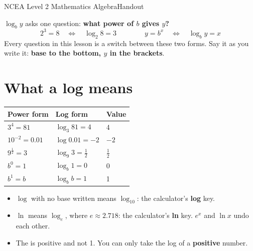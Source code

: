 \documentclass[11pt]{article}
\begin{document}
  {NCEA Level 2 Mathematics \textperiodcentered{} Algebra}{Handout}

\begin{keybox}[title={The one idea: a log is a power}]
$\log_{b} y$ asks one question: \textbf{what power of $b$ gives $y$?}
\[ 2^{3} = 8 \quad\Longleftrightarrow\quad \log_{2} 8 = 3 \qquad\qquad y = b^{x} \quad\Longleftrightarrow\quad \log_{b} y = x \]
Every question in this lesson is a switch between these two forms. Say it as you write it: \textbf{base to the bottom, $y$ in the brackets}.
\end{keybox}

\section{What a log means}\label{h2:meaning}
\begin{minipage}[t]{0.48\textwidth}\vspace{0pt}
\renewcommand\arraystretch{1.5}
\begin{tabular}{@{}l l l@{}}
\toprule
\textbf{Power form} & \textbf{Log form} & \textbf{Value}\\ \midrule
$3^{4} = 81$ & $\log_{3} 81 = 4$ & 4 \\
$10^{-2} = 0.01$ & $\log 0.01 = -2$ & $-2$ \\
$9^{\frac{1}{2}} = 3$ & $\log_{9} 3 = \frac{1}{2}$ & $\frac{1}{2}$ \\
$b^{0} = 1$ & $\log_{b} 1 = 0$ & 0 \\
$b^{1} = b$ & $\log_{b} b = 1$ & 1 \\
\bottomrule
\end{tabular}
\end{minipage}\hfill
\begin{minipage}[t]{0.48\textwidth}\vspace{0pt}
\begin{itemize}
\item $\log$ with no base written means $\log_{10}$: the calculator's \textbf{log} key.
\item $\ln$ means $\log_{e}$, where $e \approx 2.718$: the calculator's \textbf{ln} key. $e^{x}$ and $\ln x$ undo each other.
\item The \Tbase{} is positive and not 1. You can only take the log of a \textbf{positive} number.
\end{itemize}
\end{minipage}
\end{document}
